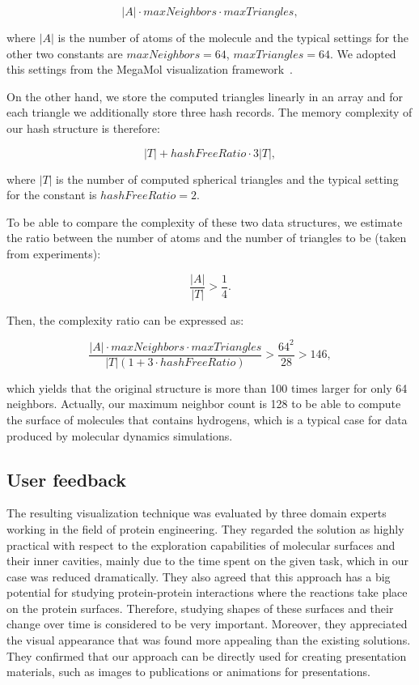 \begin{equation}
|A| \cdot maxNeighbors \cdot maxTriangles,
\end{equation}

where $|A|$ is the number of atoms of the molecule and the typical settings for the other two constants are $maxNeighbors = 64$, $maxTriangles = 64$.
We adopted this settings from the MegaMol visualization framework~\cite{grottel2015megamol}.

On the other hand, we store the computed triangles linearly in an array and for each triangle we additionally store three hash records. 
The memory complexity of our hash structure is therefore:

\begin{equation}
|T| + hashFreeRatio \cdot 3 |T|,
\end{equation}

where $|T|$ is the number of computed spherical triangles and the typical setting for the constant is $hashFreeRatio = 2$. 

To be able to compare the complexity of these two data structures, we estimate the ratio between the number of atoms and the number of triangles to be (taken from experiments):

\begin{equation}
\frac{|A|}{|T|} > \frac{1}{4}.
\end{equation}

Then, the complexity ratio can be expressed as:

\begin{equation}
\frac{|A| \cdot maxNeighbors \cdot maxTriangles}{|T|(1 + 3 \cdot hashFreeRatio)} > \frac{64^2}{28} > 146,
\end{equation}

which yields that the original structure is more than 100 times larger for only 64 neighbors.
Actually, our maximum neighbor count is 128 to be able to compute the surface of molecules that contains hydrogens, which is a typical case for data produced by molecular dynamics simulations.


\subsection{User feedback}
The resulting visualization technique was evaluated by three domain experts working in the field of protein engineering. They regarded the solution as highly practical with respect to the exploration capabilities of molecular surfaces and their inner cavities, mainly due to the time spent on the given task, which in our case was reduced dramatically.
They also agreed that this approach has a big potential for studying protein-protein interactions where the reactions take place on the protein surfaces.
Therefore, studying shapes of these surfaces and their change over time is considered to be very important.
Moreover, they appreciated the visual appearance that was found more appealing than the existing solutions.
They confirmed that our approach can be directly used for creating presentation materials, such as images to publications or animations for presentations.

